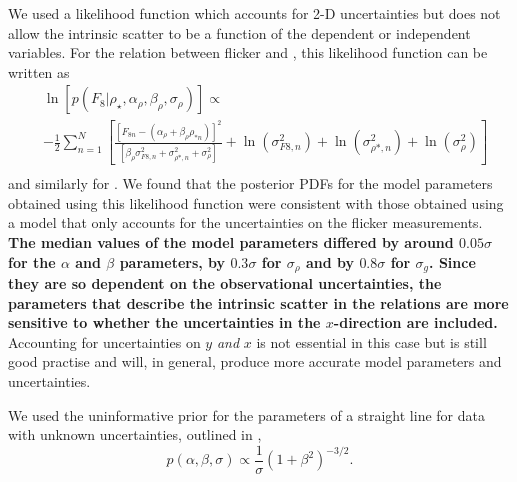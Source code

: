 We used a likelihood function which accounts for 2-D uncertainties but does
not allow the intrinsic scatter to be a function of the dependent or
independent variables.
For the relation between flicker and \rhostar, this likelihood function can be
written as
\begin{eqnarray}
	& \ln\left[p(F_8|\rho_\star, \alpha_\rho, \beta_\rho, \sigma_{\rho})\right]
        \propto  \\ \nonumber
    & -\frac{1}{2}\sum_{n=1}^N \left[\frac{[F_{8n}-(\alpha_\rho
    + \beta_\rho \rho_{*n})]^2}
	{\left[\beta_\rho \sigma_{F8, n}^2 + \sigma_{\rho *, n}^2 +
    \sigma_{\rho}^2\right]} + \ln(\sigma_{F8, n}^2) + \ln(\sigma_{\rho*, n}^2)
    + \ln(\sigma_\rho^2) \right]
	\\ \nonumber
\end{eqnarray}
\label{eq:likelihood}
and similarly for \logg.
We found that the posterior PDFs for the model parameters obtained using this
likelihood function were consistent with those obtained using a model that
only accounts for the uncertainties on the flicker measurements.
{\bf The median values of the model parameters differed by around $0.05
\sigma$ for the $\alpha$ and $\beta$ parameters, by $0.3 \sigma$ for
$\sigma_\rho$ and by $0.8 \sigma$ for $\sigma_g$.
Since they are so dependent on the observational uncertainties, the parameters
that describe the intrinsic scatter in the relations are more sensitive to
whether the uncertainties in the $x$-direction are included.}
Accounting for uncertainties on $y$ {\it and} $x$ is not essential in this
case but is still good practise and will, in general, produce more accurate
model parameters and uncertainties.


We used the uninformative prior for the parameters of a straight line for
data with unknown uncertainties, outlined in \citet{Vanderplas2014},
\begin{equation}
p(\alpha, \beta, \sigma) \propto \frac{1}{\sigma} \left( 1 + \beta^2
\right)^{-3/2}.
\end{equation}
\label{eq:priors}


